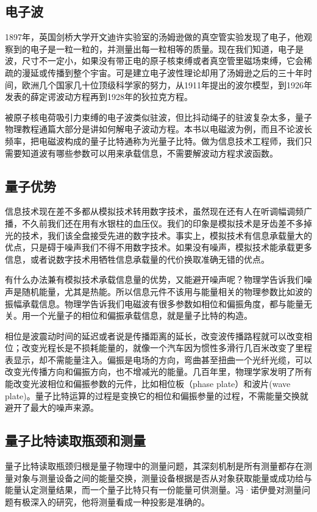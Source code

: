 \documentclass{ctexbook}
\begin{document}
\subsection{电子波}
1897年，英国剑桥大学开文迪许实验室的汤姆逊做的真空管实验发现了电子，他观察到的电子是一粒一粒的，并测量出每一粒相等的质量。现在我们知道，电子是波，尺寸不一定小，如果没有带正电的原子核束缚或者真空管里磁场束缚，它会稀疏的漫延或传播到整个宇宙。可是建立电子波性理论却用了汤姆逊之后的三十年时间，欧洲几个国家几十位顶级科学家的努力，从1911年提出的波尔模型，到1926年发表的薛定谔波动方程再到1928年的狄拉克方程。

被原子核电荷吸引力束缚的电子波类似驻波，但比抖动绳子的驻波复杂太多，量子物理教程通篇大部分是讲如何解电子波动方程。本书以电磁波为例，而且不论波长频率，把电磁波构成的量子比特通称为光量子比特。做为信息技术工程师，我们只需要知道波有哪些参数可以用来承载信息，不需要解波动方程求波函数。

\subsection{量子优势}\label{sec:whyquantum}
信息技术现在差不多都从模拟技术转用数字技术，虽然现在还有人在听调幅调频广播，不久前我们还在用有水银柱的血压仪。我们的印象是模拟技术是牙齿差不多掉光的技术，我们该全盘接受先进的数字技术。事实上，模拟技术有信息承载量大的优点，只是碍于噪声我们不得不用数字技术。如果没有噪声，模拟技术能承载更多信息，或者说数字技术用牺牲信息承载量的代价换取准确无错的优点。

有什么办法兼有模拟技术承载信息量的优势，又能避开噪声呢？物理学告诉我们噪声是随机能量，尤其是热能。所以信息元件不该用与能量相关的物理参数比如波的振幅承载信息。物理学告诉我们电磁波有很多参数如相位和偏振角度，都与能量无关。用一个光量子的相位和偏振承载信息，就是量子比特的构造。

相位是波震动时间的延迟或者说是传播距离的延长，改变波传播路程就可以改变相位；改变光程长是不损耗能量的，就像一个汽车因为惯性多滑行几百米改变了里程表显示，却不需能量注入。偏振是电场的方向，弯曲甚至扭曲一个光纤光缆，可以改变光传播方向和偏振方向，也不增减光的能量。几百年里，物理学家发明了所有能改变光波相位和偏振参数的元件，比如相位板（phase plate）和波片(wave plate)。量子比特运算的过程是变换它的相位和偏振参量的过程，不需能量交换就避开了最大的噪声来源。

\subsection{量子比特读取瓶颈和测量}
量子比特读取瓶颈归根是量子物理中的测量问题，其深刻机制是所有测量都存在测量对象与测量设备之间的能量交换，测量设备根据是否从对象获取能量或成功给与能量认定测量结果，而一个量子比特只有一份能量可供测量。冯·诺伊曼对测量问题有极深入的研究，他将测量看成一种投影是准确的。
\end{document}
